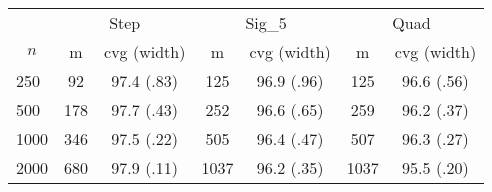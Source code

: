 \begin{tabular}{lcccccc}
   \toprule
 
           & \multicolumn{2}{c}{Step}& \multicolumn{2}{c}{Sig\_5}& \multicolumn{2}{c}{Quad} \\ 
             \cmidrule(l{2pt}r{2pt}){2-3} \cmidrule(l{2pt}r{2pt}){4-5} \cmidrule(l{2pt}r{2pt}){6-7} 
             \multicolumn{1}{c}{$n$} & \multicolumn{1}{c}{m}& \multicolumn{1}{c}{cvg (width)}& \multicolumn{1}{c}{m}& \multicolumn{1}{c}{cvg (width)}& \multicolumn{1}{c}{m}& \multicolumn{1}{c}{cvg (width)} \\ \midrule 
        250 & 92 & 97.4 (.83) & 125 & 96.9 (.96) & 125 & 96.6 (.56) \\ 
  500 & 178 & 97.7 (.43) & 252 & 96.6 (.65) & 259 & 96.2 (.37) \\ 
  1000 & 346 & 97.5 (.22) & 505 & 96.4 (.47) & 507 & 96.3 (.27) \\ 
  2000 & 680 & 97.9 (.11) & 1037 & 96.2 (.35) & 1037 & 95.5 (.20) \\ 
   \hline
\end{tabular}
